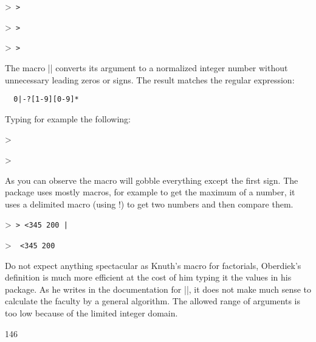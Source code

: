 \def\printf#1{\leavevmode \mbox{> \texttt{#1}}\par}

\printf{> }
\printf{> }
\printf{> }


The macro |\intcalcNum| converts its argument to a normalized integer number without unnecessary leading zeros or signs. The result matches the regular expression:

\begin{Verbatim}
  0|-?[1-9][0-9]*
\end{Verbatim}

Typing for example the following:

\begin{teX}
\end{teX}


\printf{}
\printf{}

As you can observe the macro will gobble everything except the first sign.
The package uses mostly \tex macros, for example to get the maximum of a number,
it uses a delimited macro (using !) to get two numbers and then compare them.

\begin{teX}
\makeatletter
\def\InCa@Min#1!#2!{%
 \ifnum#1<#2 %
   #1%
 \else
   #2%
 \fi
}
\printf{> \InCa@Min 200!345!|}

\def\InCa@Min#1!#2!{%
 \ifnum#1<#2 %
   #1%
 \else
   #2%
 \fi
}

\printf{\InCa@Min 200!345!}
\makeatother
\end{teX}




Do not expect anything spectacular as Knuth's macro for factorials, Oberdiek's definition is much more efficient at the cost of him typing it the values in his package.
As he writes in the documentation for  |\InCa@Fac|, it does not make much sense to calculate the faculty by a general algorithm. The
allowed range of arguments is too low because of the limited integer domain.

\begin{teXX}
146 \def\InCa@Fac#1!{%
147 \ifcase#1 1%
148 \or 1%
149 \or 2%
150 \or 6%
151 \or 24%
152 \or 120%
153 \or 720%
154 \or 5040%
155 \or 40320%
156 \or 362880%
157 \or 3628800%
158 \or 39916800%
159 \or 479001600%
160 \else
161 \ifnum#1<\z@
162    0\IntCalcError:FacNegative%
163   \else
164     0\IntCalcError:FacOverflow%
165   \fi
166 \fi
167 }
\end{teXX}

